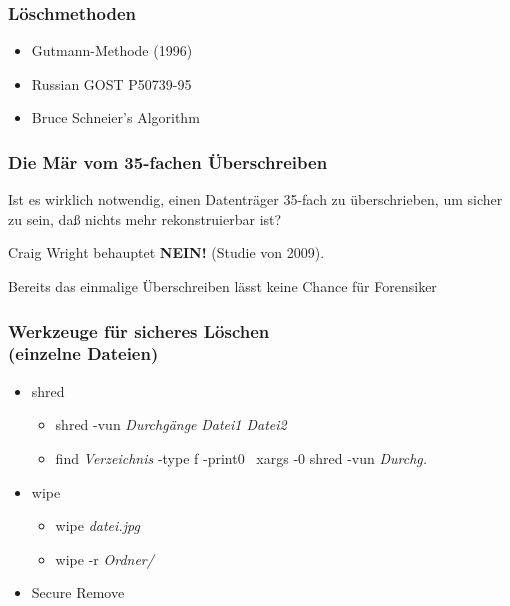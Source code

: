 \begin{frame}
  \frametitle{Löschmethoden}
  \begin{itemize}
    \item Gutmann-Methode (1996)
    \item Russian GOST P50739-95
    \item Bruce Schneier's Algorithm
  \end{itemize}
\end{frame}

\begin{frame}
  \frametitle{Die Mär vom 35-fachen Überschreiben}
  Ist es wirklich notwendig, einen Datenträger 35-fach zu überschrieben, um sicher zu sein, daß nichts mehr rekonstruierbar ist?
  \pause
  \begin{alertblock}{Craig Wright behauptet}
    {\bf NEIN!} (Studie von 2009).
  \end{alertblock}
  \pause
  Bereits das einmalige Überschreiben lässt keine Chance für Forensiker
\end{frame}

\begin{frame}
  \frametitle{Werkzeuge für sicheres Löschen\\(einzelne Dateien)}
  \begin{itemize}
    \item shred
      \begin{itemize}
        \item shred -vun \textit{Durchgänge} \textit{Datei1  Datei2}
        \item find \textit{Verzeichnis} -type f -print0 \textbar ~xargs -0 shred -vun \textit{Durchg.}
      \end{itemize}
    \item wipe
      \begin{itemize}
        \item wipe \textit{datei.jpg}
        \item wipe -r \textit{Ordner/}
      \end{itemize}
    \item Secure Remove
  \end{itemize}
\end{frame}

